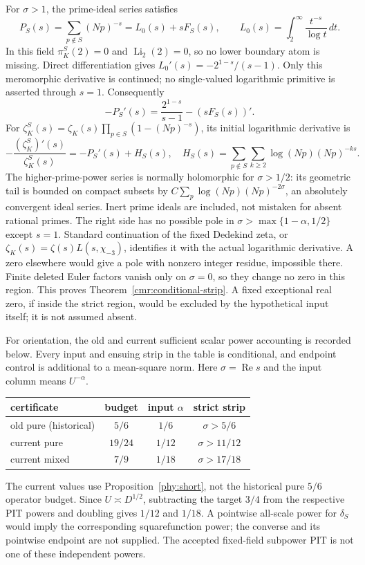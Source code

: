 \documentclass[11pt]{article}
\theoremstyle{definition}\newtheorem{definition}[theorem]{Definition}
\theoremstyle{remark}\newtheorem{remark}[theorem]{Remark}
\begin{document}
For $\sigma>1$, the prime-ideal series satisfies
\[
 P_S(s)=\sum_{p\notin S}(Np)^{-s}
       =L_0(s)+sF_S(s),\qquad
 L_0(s)=\int_2^\infty\frac{t^{-s}}{\log t}\,dt.
\]
In this field $\pi_K^S(2)=0$ and $\operatorname{Li}_2(2)=0$, so no
lower boundary atom is missing. Direct differentiation gives
$L_0'(s)=-2^{1-s}/(s-1)$. Only this meromorphic derivative is
continued; no single-valued logarithmic primitive is asserted through
$s=1$. Consequently
\[
 -P_S'(s)=\frac{2^{1-s}}{s-1}-(sF_S(s))'.
\]
For $\zeta_K^S(s)=\zeta_K(s)\prod_{p\in S}(1-(Np)^{-s})$, its
initial logarithmic derivative is
\[
 -\frac{(\zeta_K^S)'(s)}{\zeta_K^S(s)}
   =-P_S'(s)+H_S(s),\quad
 H_S(s)=\sum_{p\notin S}\sum_{k\ge2}
                          \log(Np)(Np)^{-ks}.
\]
The higher-prime-power series is normally holomorphic for
$\sigma>1/2$: its geometric tail is bounded on compact subsets by
$C\sum_p\log(Np)(Np)^{-2\sigma}$, an absolutely convergent ideal
series. Inert prime ideals are included, not mistaken for absent
rational primes. The right side has no possible pole in
$\sigma>\max\{1-\alpha,1/2\}$ except $s=1$.
Standard continuation of the fixed Dedekind zeta, or
$\zeta_K(s)=\zeta(s)L(s,\chi_{-3})$, identifies it with the actual
logarithmic derivative. A zero elsewhere would give a pole with
nonzero integer residue, impossible there. Finite deleted Euler
factors vanish only on $\sigma=0$, so they change no zero in this
region. This proves Theorem~\ref{cmr:conditional-strip}.
A fixed exceptional real zero, if inside the strict region, would be
excluded by the hypothetical input itself; it is not assumed absent.

For orientation, the old and current sufficient scalar power accounting
is recorded below. Every input and ensuing strip in the table is
conditional, and endpoint control is additional to a mean-square norm.
Here $\sigma=\operatorname{Re}s$ and the input column means $U^{-\alpha}$.
\begin{center}
\begin{tabular}{lccc}
certificate & budget & input $\alpha$ & strict strip\\
\hline
old pure (historical) & $5/6$ & $1/6$ & $\sigma>5/6$\\
current pure & $19/24$ & $1/12$ & $\sigma>11/12$\\
current mixed & $7/9$ & $1/18$ & $\sigma>17/18$
\end{tabular}
\end{center}
The current values use Proposition~\ref{phy:short}, not the historical pure
$5/6$ operator budget. Since $U\asymp D^{1/2}$, subtracting the
target $3/4$ from the respective PIT powers and doubling gives
$1/12$ and $1/18$. A pointwise all-scale power for $\delta_S$ would
imply the corresponding squarefunction power; the converse and its
pointwise endpoint are not supplied. The accepted fixed-field
subpower PIT is not one of these independent powers.
\end{document}
